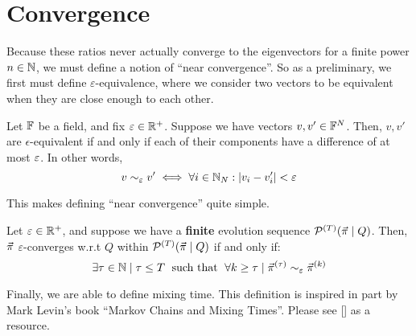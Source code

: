 \section{Convergence}

Because these ratios never actually converge to the eigenvectors for a finite power $n \in \mathbb{N}$, we must define a notion of ``near convergence''.
So as a preliminary, we first must define $\varepsilon$-equivalence, where we consider two vectors to be equivalent when they are close enough to each other.

\begin{definition}
Let $\mathbb{F}$ be a field, and fix $\varepsilon \in \mathbb{R}^+$. Suppose we have vectors $v, v' \in \mathbb{F}^N$.
Then, $v, v'$ are $\epsilon$-equivalent if and only if each of their components have a difference of at most $\varepsilon$.
In other words,
$$v \sim_\varepsilon v' \iff \forall i \in \mathbb{N}_N: |v_i - v'_i| < \varepsilon$$
\end{definition}




This makes defining ``near convergence'' quite simple.

\begin{definition}
Let $\varepsilon \in \mathbb{R}^+$, and suppose we have a \textbf{finite} evolution sequence $\mathcal{P}^{(T)}(\vec{\pi} \mid Q)$.
Then, $\vec{\pi}$ $\varepsilon$-converges w.r.t $Q$ within $\mathcal{P}^{(T)}(\vec{\pi} \mid Q)$ if and only if:
$$ \exists \tau \in \mathbb{N} \mid \tau \leq T \text{\; such that \;} \forall k \geq \tau \mid \vec{\pi}^{(\tau)} \sim_\varepsilon \vec{\pi}^{(k)}$$
\end{definition}

Finally, we are able to define mixing time.
This definition is inspired in part by Mark Levin's book ``Markov Chains and Mixing Times''.
Please see [\cite{levin}] as a resource.

